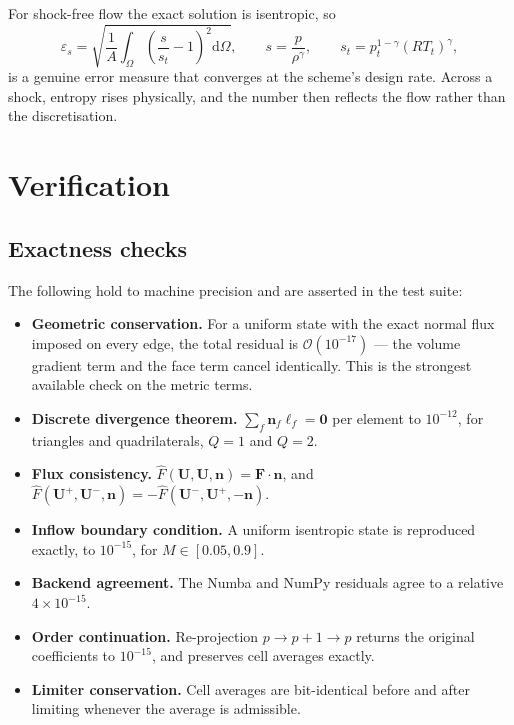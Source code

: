 \documentclass[11pt,a4paper]{article}
\newcommand{\vect}[1]{\boldsymbol{#1}}
\newcommand{\Uvec}{\vect{U}}
\newcommand{\Fvec}{\vect{F}}
\newcommand{\nvec}{\vect{n}}
\begin{document}
For shock-free flow the exact solution is isentropic, so
\begin{equation}
  \varepsilon_s = \sqrt{\frac{1}{A}\int_{\Omega}
    \left(\frac{s}{s_t} - 1\right)^{2}\mathrm{d}\Omega},
  \qquad
  s = \frac{p}{\rho^{\gamma}},
  \qquad
  s_t = p_t^{1-\gamma}\left(R T_t\right)^{\gamma},
  \label{eq:entropyerr}
\end{equation}
is a genuine error measure that converges at the scheme's design rate.  Across a
shock, entropy rises physically, and the number then reflects the flow rather
than the discretisation.

\section{Verification}
\label{sec:verify}

\subsection{Exactness checks}

The following hold to machine precision and are asserted in the test suite:

\begin{itemize}\itemsep2pt
  \item \textbf{Geometric conservation.}  For a uniform state with the exact
    normal flux imposed on every edge, the total residual is
    $\mathcal{O}(10^{-17})$ --- the volume gradient term and the face term cancel
    identically.  This is the strongest available check on the metric terms.
  \item \textbf{Discrete divergence theorem.}  $\sum_f \nvec_f \ell_f = \vect{0}$
    per element to $10^{-12}$, for triangles and quadrilaterals, $Q = 1$ and
    $Q = 2$.
  \item \textbf{Flux consistency.}  $\hat{F}(\Uvec, \Uvec, \nvec) = \Fvec\!\cdot\!\nvec$,
    and $\hat{F}(\Uvec^{+}, \Uvec^{-}, \nvec) = -\hat{F}(\Uvec^{-}, \Uvec^{+}, -\nvec)$.
  \item \textbf{Inflow boundary condition.}  A uniform isentropic state is
    reproduced exactly, to $10^{-15}$, for $M \in [0.05, 0.9]$.
  \item \textbf{Backend agreement.}  The Numba and NumPy residuals agree to a
    relative $4\times10^{-15}$.
  \item \textbf{Order continuation.}  Re-projection $p \to p+1 \to p$ returns the
    original coefficients to $10^{-15}$, and preserves cell averages exactly.
  \item \textbf{Limiter conservation.}  Cell averages are bit-identical before and
    after limiting whenever the average is admissible.
\end{itemize}
\end{document}
